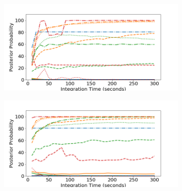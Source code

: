 \begin{figure}[H]
     \centering
     \begin{subfigure}[b]{0.49\textwidth}
         \centering
         \includegraphics[width=\textwidth]{images/realspectra-cal-co60-0-easy.png}
         \caption{}
         \label{fig:realspectra-cal-co60-0-easy}
     \end{subfigure}
     \hfill
     \begin{subfigure}[b]{0.49\textwidth}
         \centering
         \includegraphics[width=\textwidth]{images/realspectra-cal-co60-1-easy.png}
         \caption{}
         \label{fig:realspectra-cal-co60-1-easy}
     \end{subfigure}


\end{figure}
